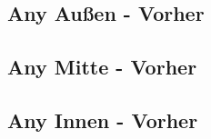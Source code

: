 





\subsection*{Any Außen - Vorher}

\subsection*{Any Mitte - Vorher}

\subsection*{Any Innen - Vorher}

% 


